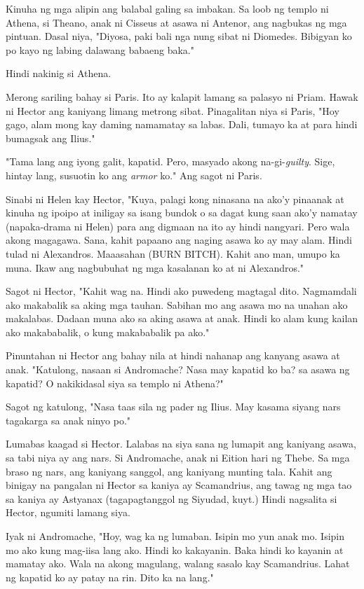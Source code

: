 \documentclass[12pt,letterpaper]{report}
\begin{document}
Kinuha ng mga alipin ang balabal galing sa imbakan. Sa loob ng templo ni Athena, si Theano, anak ni Cisseus at asawa ni Antenor, ang nagbukas ng mga pintuan. Dasal niya, "Diyosa, paki bali nga nung sibat ni Diomedes. Bibigyan ko po kayo ng labing dalawang babaeng baka."

Hindi nakinig si Athena.

Merong sariling bahay si Paris. Ito ay kalapit lamang sa palasyo ni Priam. Hawak ni Hector ang kaniyang limang metrong sibat. Pinagalitan niya si Paris, "Hoy gago, alam mong kay daming namamatay sa labas. Dali, tumayo ka at para hindi bumagsak ang Ilius."

"Tama lang ang iyong galit, kapatid. Pero, masyado akong na-gi-\textit{guilty}. Sige, hintay lang, susuotin ko ang \textit{armor} ko." Ang sagot ni Paris.

Sinabi ni Helen kay Hector, "Kuya, palagi kong ninasana na ako'y pinaanak at kinuha ng ipoipo at iniligay sa isang bundok o sa dagat kung saan ako'y namatay (napaka-drama ni Helen) para ang digmaan na ito ay hindi nangyari. Pero wala akong magagawa. Sana, kahit papaano ang naging asawa ko ay may alam. Hindi tulad ni Alexandros. Maaasahan (BURN BITCH). Kahit ano man, umupo ka muna. Ikaw ang nagbubuhat ng mga kasalanan ko at ni Alexandros."

Sagot ni Hector, "Kahit wag na. Hindi ako puwedeng magtagal dito. Nagmamdali ako makabalik sa aking mga tauhan. Sabihan mo ang asawa mo na unahan ako makalabas. Dadaan muna ako sa aking asawa at anak. Hindi ko alam kung kailan ako makababalik, o kung makababalik pa ako."

Pinuntahan ni Hector ang bahay nila at hindi nahanap ang kanyang asawa at anak. "Katulong, nasaan si Andromache? Nasa may kapatid ko ba? sa asawa ng kapatid? O nakikidasal siya sa templo ni Athena?"

Sagot ng katulong, "Nasa taas sila ng pader ng Ilius. May kasama siyang nars tagakarga sa anak ninyo po."

Lumabas kaagad si Hector. Lalabas na siya sana ng lumapit ang kaniyang asawa, sa tabi niya ay ang nars. Si Andromache, anak ni Eition hari ng Thebe. Sa mga braso ng nars, ang kaniyang sanggol, ang kaniyang munting tala. Kahit ang binigay na pangalan ni Hector sa kaniya ay Scamandrius, ang tawag ng mga tao sa kaniya ay Astyanax (tagapagtanggol ng Siyudad, kuyt.) Hindi nagsalita si Hector, ngumiti lamang siya.

Iyak ni Andromache, "Hoy, wag ka ng lumaban. Isipin mo yun anak mo. Isipin mo ako kung mag-iisa lang ako. Hindi ko kakayanin. Baka hindi ko kayanin at mamatay ako. Wala na akong magulang, walang sasalo kay Scamandrius. Lahat ng kapatid ko ay patay na rin. Dito ka na lang."
\end{document}
